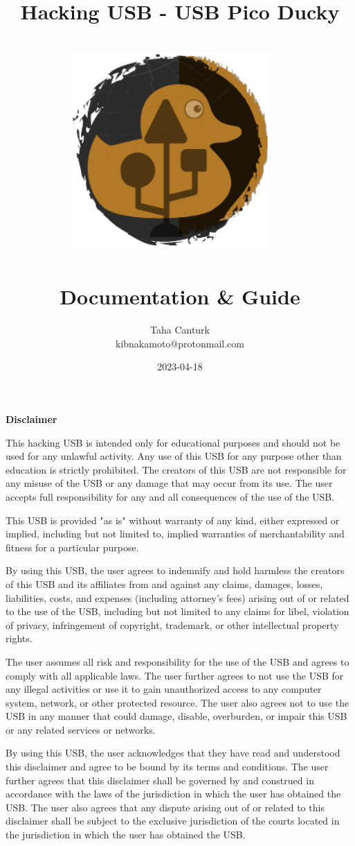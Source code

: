 \documentclass[a4paper,12pt]{article}
\title{
	\Huge Hacking USB - USB Pico Ducky\\
	\ \\
	\includegraphics[width=75.5mm]{pictures/logo.png}
	\ \\
	\ \\
	\Large Documentation \& Guide
}
\author{Taha Canturk\\kibnakamoto@protonmail.com}
\date{2023-04-18}
\begin{document}
\maketitle

\newpage

\textbf{Disclaimer}

\vspace{0.2in}

This hacking USB is intended only for educational purposes and should not be used for any unlawful activity. Any use of this USB for any purpose other than education is strictly prohibited. The creators of this USB are not responsible for any misuse of the USB or any damage that may occur from its use. The user accepts full responsibility for any and all consequences of the use of the USB.

This USB is provided "as is" without warranty of any kind, either expressed or implied, including but not limited to, implied warranties of merchantability and fitness for a particular purpose.

By using this USB, the user agrees to indemnify and hold harmless the creators of this USB and its affiliates from and against any claims, damages, losses, liabilities, costs, and expenses (including attorney's fees) arising out of or related to the use of the USB, including but not limited to any claims for libel, violation of privacy, infringement of copyright, trademark, or other intellectual property rights.

The user assumes all risk and responsibility for the use of the USB and agrees to comply with all applicable laws. The user further agrees to not use the USB for any illegal activities or use it to gain unauthorized access to any computer system, network, or other protected resource. The user also agrees not to use the USB in any manner that could damage, disable, overburden, or impair this USB or any related services or networks.

By using this USB, the user acknowledges that they have read and understood this disclaimer and agree to be bound by its terms and conditions. The user further agrees that this disclaimer shall be governed by and construed in accordance with the laws of the jurisdiction in which the user has obtained the USB. The user also agrees that any dispute arising out of or related to this disclaimer shall be subject to the exclusive jurisdiction of the courts located in the jurisdiction in which the user has obtained the USB.
\end{document}
